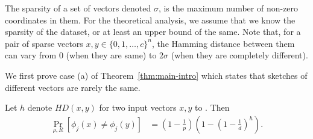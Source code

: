 The sparsity of a set of vectors denoted $\sigma$, is the maximum number of non-zero coordinates in them. For the theoretical analysis, we assume that we know the sparsity of the dataset, or at least an upper bound of the same. Note that, for a pair of sparse vectors $x, y \in \{0, 1, \ldots, c\}^n$, the  Hamming distance between them can vary from $0$ (when they are same) to $2\sigma$ (when they are completely different).

We first prove case (a) of Theorem~\ref{thm:main-intro} which states that sketches of different vectors are rarely the same.

\begin{lem}\label{lem:expectation-previous}
Let $h$ denote $HD(x,y)$ for two input vectors $x,y$ to \fsketch. Then
\begin{align*}
\Pr_{\rho,R} [\phi_j(x)\not=\phi_j(y)] &= (1-\tfrac{1}{p})(1-(1-\tfrac{1}{d})^h).
\end{align*}
\end{lem}



